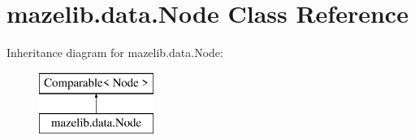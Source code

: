 \hypertarget{classmazelib_1_1data_1_1_node}{\section{mazelib.\-data.\-Node Class Reference}
\label{classmazelib_1_1data_1_1_node}
}
Inheritance diagram for mazelib.\-data.\-Node\-:\begin{figure}[H]
\begin{center}
\leavevmode
\includegraphics[height=2.000000cm]{classmazelib_1_1data_1_1_node}
\end{center}
\end{figure}
